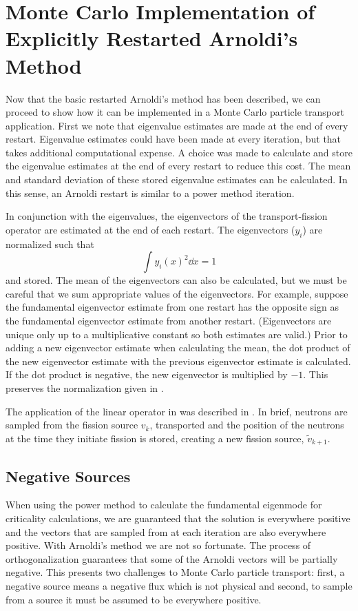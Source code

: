 \section{Monte Carlo Implementation of Explicitly Restarted Arnoldi's Method \label{sec:MCERAM}}
Now that the basic restarted Arnoldi's method has been described, we can proceed to show how it can be implemented in a Monte Carlo particle transport application.  First we note that eigenvalue estimates are made at the end of every restart.  Eigenvalue estimates could have been made at every iteration, but that takes additional computational expense.  A choice was made to calculate and store the eigenvalue estimates at the end of every restart to reduce this cost.  The mean and standard deviation of these stored eigenvalue estimates can be calculated.  In this sense, an Arnoldi restart is similar to a power method iteration.  

In conjunction with the eigenvalues, the eigenvectors of the transport-fission operator are estimated at the end of each restart.  The eigenvectors ($y_i$) are normalized such that 
\begin{equation}
    \int y_i(x)^2 \dd x = 1
    \label{eq:NormalizedEigenvectors}
\end{equation}
and stored.  The mean of the eigenvectors can also be calculated, but we must be careful that we sum appropriate values of the eigenvectors.  For example, suppose the fundamental eigenvector estimate from one restart has the opposite sign as the fundamental eigenvector estimate from another restart.  (Eigenvectors are unique only up to a multiplicative constant so both estimates are valid.)  Prior to adding a new eigenvector estimate when calculating the mean, the dot product of the new eigenvector estimate with the previous eigenvector estimate is calculated.  If the dot product is negative, the new eigenvector is multiplied by $-1$.  This preserves the normalization given in .

The application of the linear operator in  was described in .  In brief, neutrons are sampled from the fission source $v_k$, transported and the position of the neutrons at the time they initiate fission is stored, creating a new fission source, $\tilde{v}_{k+1}$.  

\subsection{Negative Sources \label{sec:NegativeSource}}
When using the power method to calculate the fundamental eigenmode for criticality calculations, we are guaranteed that the solution is everywhere positive and the vectors that are sampled from at each iteration are also everywhere positive.  With Arnoldi's method we are not so fortunate.  The process of orthogonalization guarantees that some of the Arnoldi vectors will be partially negative.  This presents two challenges to Monte Carlo particle transport: first, a negative source means a negative flux which is not physical and second, to sample from a source it must be assumed to be everywhere positive.  

